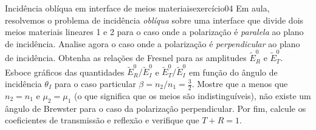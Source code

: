 \begin{exercício}{Incidência oblíqua em interface de meios materiais}{exercício04}
    Em aula, resolvemos o problema de incidência \emph{oblíqua} sobre uma interface que divide dois meios materiais lineares 1 e 2 para o caso onde a polarização é \emph{paralela} ao plano de incidência. Analise agora o caso onde a polarização é \emph{perpendicular} ao plano de incidência. Obtenha as relações de Fresnel para as amplitudes \(\tilde{E}_R^0\) e \(\tilde{E}_T^0\). Esboce gráficos das quantidades \(\tilde{E}_R^0/\tilde{E}_I^0\) e \(\tilde{E}_T^0/\tilde{E}_I^0\) em função do ângulo  de incidência \(\theta_I\) para o caso particular \(\beta = n_2/n_1 = \frac32\). Mostre que a menos que \(n_2 = n_1\) e \(\mu_2 = \mu_1\) (o que significa que os meios são indistinguíveis), não existe um ângulo de Brewster para o caso da polarização perpendicular. Por fim, calcule os coeficientes de transmissão e reflexão e verifique que \(T + R = 1\).
\end{exercício}
